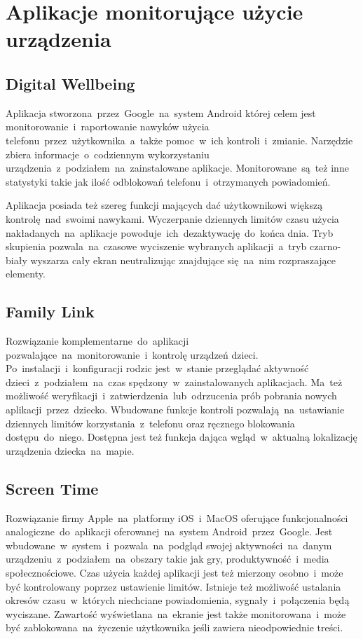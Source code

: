 \section{Aplikacje monitorujące użycie urządzenia}

\subsection{Digital Wellbeing}
\label{sec:digital_wellbeing}
Aplikacja stworzona~przez~Google~na~system Android której celem jest monitorowanie~i~raportowanie nawyków użycia telefonu~przez~użytkownika~a~także pomoc~w~ich kontroli~i~zmianie. Narzędzie zbiera informacje~o~codziennym wykorzystaniu urządzenia~z~podziałem~na~zainstalowane aplikacje. Monitorowane~są~też inne statystyki takie jak ilość odblokowań telefonu~i~otrzymanych powiadomień. 
\bigskip
{}

Aplikacja posiada też szereg funkcji mających dać użytkownikowi większą kontrolę~nad~swoimi nawykami. Wyczerpanie dziennych limitów czasu użycia nakładanych~na~aplikacje powoduje~ich~dezaktywację~do~końca dnia. Tryb skupienia pozwala~na~czasowe wyciszenie wybranych aplikacji~a~tryb czarno-biały wyszarza cały ekran neutralizując znajdujące się~na~nim rozpraszające elementy.

\subsection{Family Link}
Rozwiązanie komplementarne~do~aplikacji  pozwalające~na~monitorowanie~i~kontrolę urządzeń dzieci. Po~instalacji~i~konfiguracji rodzic jest~w~stanie przeglądać aktywność dzieci~z~podziałem~na~czas spędzony~w~zainstalowanych aplikacjach. Ma~też możliwość weryfikacji~i~zatwierdzenia~lub~odrzucenia prób pobrania nowych aplikacji~przez~dziecko. Wbudowane funkcje kontroli pozwalają~na~ustawianie dziennych limitów korzystania~z~telefonu oraz ręcznego blokowania dostępu~do~niego. Dostępna jest też funkcja dająca wgląd~w~aktualną lokalizację urządzenia dziecka~na~mapie.

\subsection{Screen Time}
Rozwiązanie firmy Apple~na~platformy iOS~i~MacOS oferujące funkcjonalności analogiczne~do~aplikacji  oferowanej~na~system Android~przez~Google. Jest wbudowane~w~system~i~pozwala~na~podgląd swojej aktywności~na~danym urządzeniu~z~podziałem~na~obszary takie jak gry, produktywność~i~media społecznościowe. Czas użycia każdej aplikacji jest też mierzony osobno~i~może być kontrolowany poprzez ustawienie limitów. Istnieje też możliwość ustalania okresów czasu~w~których niechciane powiadomienia, sygnały~i~połączenia będą wyciszane. Zawartość wyświetlana~na~ekranie jest także monitorowana~i~może być zablokowana~na~życzenie użytkownika jeśli zawiera nieodpowiednie treści.

